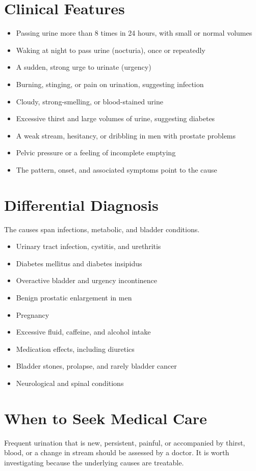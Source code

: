 \section*{Clinical Features}
\begin{itemize}
    \item Passing urine more than 8 times in 24 hours, with small or normal volumes
    \item Waking at night to pass urine (nocturia), once or repeatedly
    \item A sudden, strong urge to urinate (urgency)
    \item Burning, stinging, or pain on urination, suggesting infection
    \item Cloudy, strong-smelling, or blood-stained urine
    \item Excessive thirst and large volumes of urine, suggesting diabetes
    \item A weak stream, hesitancy, or dribbling in men with prostate problems
    \item Pelvic pressure or a feeling of incomplete emptying
    \item The pattern, onset, and associated symptoms point to the cause
\end{itemize}

\section*{Differential Diagnosis}
The causes span infections, metabolic, and bladder conditions.
\begin{itemize}
    \item Urinary tract infection, cystitis, and urethritis
    \item Diabetes mellitus and diabetes insipidus
    \item Overactive bladder and urgency incontinence
    \item Benign prostatic enlargement in men
    \item Pregnancy
    \item Excessive fluid, caffeine, and alcohol intake
    \item Medication effects, including diuretics
    \item Bladder stones, prolapse, and rarely bladder cancer
    \item Neurological and spinal conditions
\end{itemize}

\section*{When to Seek Medical Care}
Frequent urination that is new, persistent, painful, or accompanied by thirst, blood, or a change in stream should be assessed by a doctor. It is worth investigating because the underlying causes are treatable.

